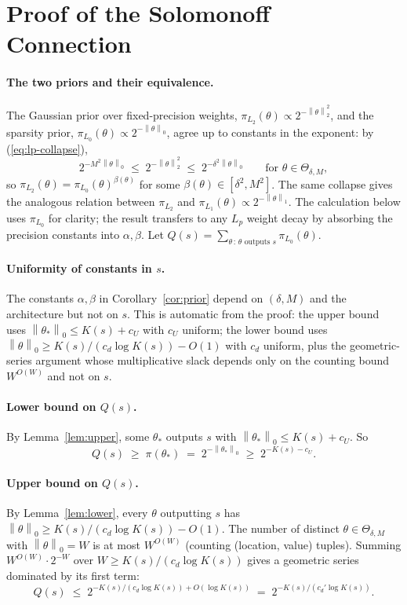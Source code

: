 \documentclass{article}
\theoremstyle{definition}
\newcommand{\norm}[1]{\left\lVert#1\right\rVert}
\newcommand{\Param}{\Theta}
\begin{document}
\section{Proof of the Solomonoff Connection}\label{app:prior}

\paragraph{The two priors and their equivalence.} The Gaussian prior over fixed-precision weights, $\pi_{L_2}(\theta) \propto
  2^{-\norm{\theta}_2^2}$, and the sparsity prior, $\pi_{L_0}(\theta) \propto
  2^{-\norm{\theta}_0}$, agree up to constants in the exponent: by
(\ref{eq:lp-collapse}),
\[
  2^{-M^2 \norm{\theta}_0} \;\le\; 2^{-\norm{\theta}_2^2} \;\le\; 2^{-\delta^2 \norm{\theta}_0}
  \qquad \text{for } \theta \in \Param_{\delta, M},
\]
so $\pi_{L_2}(\theta) = \pi_{L_0}(\theta)^{\beta(\theta)}$ for some
$\beta(\theta) \in [\delta^2, M^2]$. The same collapse gives the analogous
relation between $\pi_{L_2}$ and $\pi_{L_1}(\theta) \propto
  2^{-\norm{\theta}_1}$. The calculation below uses $\pi_{L_0}$ for clarity; the
result transfers to any $L_p$ weight decay by absorbing the precision constants
into $\alpha, \beta$. Let $Q(s) = \sum_{\theta \,:\, \theta \text{ outputs } s}
  \pi_{L_0}(\theta)$.

\paragraph{Uniformity of constants in $s$.} The constants $\alpha, \beta$ in Corollary~\ref{cor:prior} depend on $(\delta,
  M)$ and the architecture but not on $s$. This is automatic from the proof: the
upper bound uses $\norm{\theta_*}_0 \le K(s) + c_U$ with $c_U$ uniform; the
lower bound uses $\norm{\theta}_0 \ge K(s)/(c_d \log K(s)) - O(1)$ with $c_d$
uniform, plus the geometric-series argument whose multiplicative slack depends
only on the counting bound $W^{O(W)}$ and not on $s$.

\paragraph{Lower bound on $Q(s)$.} By Lemma~\ref{lem:upper}, some $\theta_*$ outputs $s$ with $\norm{\theta_*}_0
  \le K(s) + c_U$. So
\[
  Q(s) \;\ge\; \pi(\theta_*) \;=\; 2^{-\norm{\theta_*}_0} \;\ge\; 2^{-K(s) - c_U}.
\]

\paragraph{Upper bound on $Q(s)$.} By Lemma~\ref{lem:lower}, every $\theta$ outputting $s$ has $\norm{\theta}_0
  \ge K(s)/(c_d \log K(s)) - O(1)$. The number of distinct $\theta \in
  \Param_{\delta, M}$ with $\norm{\theta}_0 = W$ is at most $W^{O(W)}$ (counting
(location, value) tuples). Summing $W^{O(W)} \cdot 2^{-W}$ over $W \ge
  K(s)/(c_d \log K(s))$ gives a geometric series dominated by its first term:
\[
  Q(s) \;\le\; 2^{-K(s)/(c_d \log K(s)) + O(\log K(s))} \;=\; 2^{-K(s)/(c_d' \log K(s))}.
\]
\end{document}
